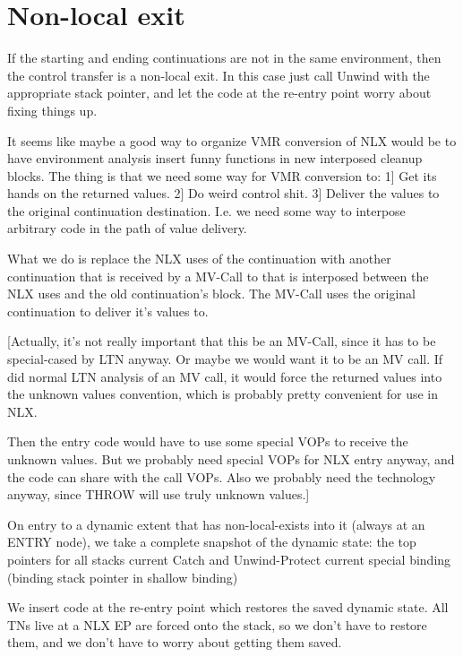 
\section{Non-local exit}


If the starting and ending continuations are not in the same environment, then
the control transfer is a non-local exit.  In this case just call Unwind with
the appropriate stack pointer, and let the code at the re-entry point worry
about fixing things up.

It seems like maybe a good way to organize VMR conversion of NLX would be to
have environment analysis insert funny functions in new interposed cleanup
blocks.  The thing is that we need some way for VMR conversion to:
 1] Get its hands on the returned values.
 2] Do weird control shit.
 3] Deliver the values to the original continuation destination.
I.e. we need some way to interpose arbitrary code in the path of value
delivery.

What we do is replace the NLX uses of the continuation with another
continuation that is received by a MV-Call to %
that is interposed between the NLX uses and the old continuation's block.  The
MV-Call uses the original continuation to deliver it's values to.  

[Actually, it's not really important that this be an MV-Call, since it has to
be special-cased by LTN anyway.  Or maybe we would want it to be an MV call.
If did normal LTN analysis of an MV call, it would force the returned values
into the unknown values convention, which is probably pretty convenient for use
in NLX.

Then the entry code would have to use some special VOPs to receive the unknown
values.  But we probably need special VOPs for NLX entry anyway, and the code
can share with the call VOPs.  Also we probably need the technology anyway,
since THROW will use truly unknown values.]


On entry to a dynamic extent that has non-local-exists into it (always at an
ENTRY node), we take a complete snapshot of the dynamic state:
    the top pointers for all stacks
    current Catch and Unwind-Protect
    current special binding (binding stack pointer in shallow binding)

We insert code at the re-entry point which restores the saved dynamic state.
All TNs live at a NLX EP are forced onto the stack, so we don't have to restore
them, and we don't have to worry about getting them saved.

